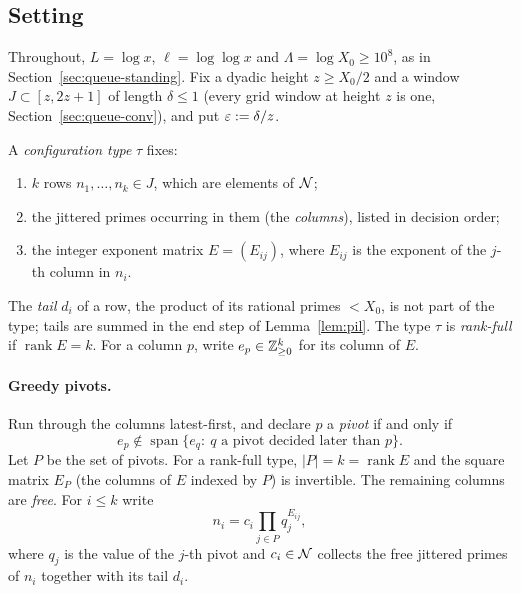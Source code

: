 \subsection{Setting}\label{sec:A-setting}

Throughout, $L=\log x$, $\ell=\log\log x$ and $\Lambda=\log X_0\ge 10^{8}$, as in Section~\ref{sec:queue-standing}.
Fix a dyadic height $z\ge X_0/2$ and a window $J\subset[z,2z+1]$ of length $\delta\le 1$ (every grid window at height $z$
is one, Section~\ref{sec:queue-conv}), and put $\varepsilon:=\delta/z$.

\begin{definition}\label{def:config-type}
A \emph{configuration type} $\tau$ fixes:
\begin{enumerate}[label=(\alph*)]
\item $k$ rows $n_1,\dots,n_k\in J$, which are elements of $\mathcal{N}$;
\item the jittered primes occurring in them (the \emph{columns}), listed in decision order;
\item the integer exponent matrix $E=(E_{ij})$, where $E_{ij}$ is the exponent of the $j$-th column in $n_i$.
\end{enumerate}
The \emph{tail} $d_i$ of a row, the product of its rational primes $<X_0$, is not part of the type; tails are summed in
the end step of Lemma~\ref{lem:pil}.
The type $\tau$ is \emph{rank-full} if $\operatorname{rank}E=k$. For a column $p$, write $e_p\in\mathbb{Z}_{\ge0}^{k}$ for its
column of $E$.
\end{definition}

\paragraph{Greedy pivots.}
Run through the columns latest-first, and declare $p$ a \emph{pivot} if and only if
\[
  e_p\notin\operatorname{span}\{e_q:\ q\text{ a pivot decided later than }p\}.
\]
Let $P$ be the set of pivots. For a rank-full type, $|P|=k=\operatorname{rank}E$ and the square matrix $E_P$ (the
columns of $E$ indexed by $P$) is invertible. The remaining columns are \emph{free}. For $i\le k$ write
\[
  n_i=c_i\prod_{j\in P}q_j^{E_{ij}},
\]
where $q_j$ is the value of the $j$-th pivot and $c_i\in\mathcal{N}$ collects the free jittered primes of $n_i$ together with its
tail $d_i$.

